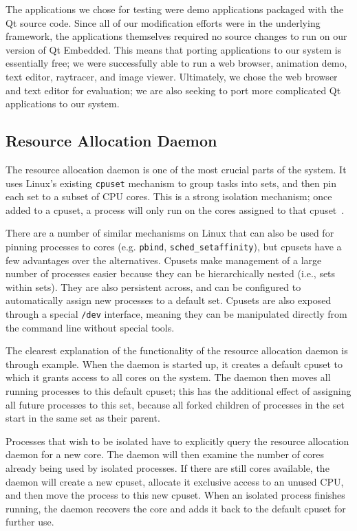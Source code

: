 \documentclass[letterpaper,twocolumn,11pt]{article}
\begin{document}
The applications we chose for testing were demo applications packaged with the Qt source code. Since all of our modification efforts were in the underlying framework, the applications themselves required no source changes to run on our version of Qt Embedded. This means that porting applications to our system is essentially free; we were successfully able to run a web browser, animation demo, text editor, raytracer, and image viewer. Ultimately, we chose the web browser and text editor for evaluation; we are also seeking to port more complicated Qt applications to our system.

\subsection{Resource Allocation Daemon}

The resource allocation daemon is one of the most crucial parts of the system. It uses Linux's existing {\tt cpuset} mechanism to group tasks into sets, and then pin each set to a subset of CPU cores. This is a strong isolation mechanism; once added to a cpuset, a process will only run on the cores assigned to that cpuset~\cite{cpusets}.

There are a number of similar mechanisms on Linux that can also be used for pinning processes to cores (e.g. {\tt pbind}, {\tt sched\_setaffinity}), but cpusets have a few advantages over the alternatives. Cpusets make management of a large number of processes easier because they can be hierarchically nested (i.e., sets within sets). They are also persistent across, and can be configured to automatically assign new processes to a default set. Cpusets are also exposed through a special {\tt /dev} interface, meaning they can be manipulated directly from the command line without special tools.

The clearest explanation of the functionality of the resource allocation daemon is through example. When the daemon is started up, it creates a default cpuset to which it grants access to all cores on the system. The daemon then moves all running processes to this default cpuset; this has the additional effect of assigning all future processes to this set, because all forked children of processes in the set start in the same set as their parent.

Processes that wish to be isolated have to explicitly query the resource allocation daemon for a new core. The daemon will then examine the number of cores already being used by isolated processes. If there are still cores available, the daemon will create a new cpuset, allocate it exclusive access to an unused CPU, and then move the process to this new cpuset. When an isolated process finishes running, the daemon recovers the core and adds it back to the default cpuset for further use.
\end{document}
